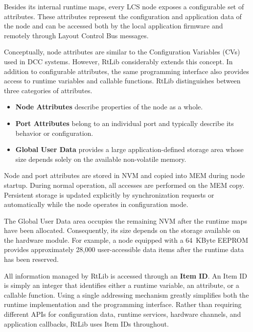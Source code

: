
Besides its internal runtime maps, every LCS node exposes a configurable set of 
attributes. These attributes represent the configuration and application data of 
the node and can be accessed both by the local application firmware and remotely 
through Layout Control Bus messages.

Conceptually, node attributes are similar to the Configuration Variables (CVs) 
used in DCC systems. However, RtLib considerably extends this concept. In addition 
to configurable attributes, the same programming interface also provides access 
to runtime variables and callable functions. RtLib distinguishes between three 
categories of attributes.

\begin{itemize}
    \item \textbf{Node Attributes} describe properties of the node as a whole.
    \item \textbf{Port Attributes} belong to an individual port and typically 
    describe its behavior or configuration.
    \item \textbf{Global User Data} provides a large application-defined storage
    area whose size depends solely on the available non-volatile memory.
\end{itemize}

Node and port attributes are stored in NVM and copied into MEM during node startup.
During normal operation, all accesses are performed on the MEM copy. Persistent 
storage is updated explicitly by synchronization requests or automatically while 
the node operates in configuration mode.

The Global User Data area occupies the remaining NVM after the runtime maps 
have been allocated. Consequently, its size depends on the storage available 
on the hardware module. For example, a node equipped with a 64~KByte EEPROM 
provides approximately 28,000 user-accessible data items after the runtime data 
has been reserved.


All information managed by RtLib is accessed through an \textbf{Item ID}. An 
Item ID is simply an integer that identifies either a runtime variable, an 
attribute, or a callable function. Using a single addressing mechanism greatly 
simplifies both the runtime implementation and the programming interface. Rather 
than requiring different APIs for configuration data, runtime services, hardware 
channels, and application callbacks, RtLib uses Item IDs throughout.

